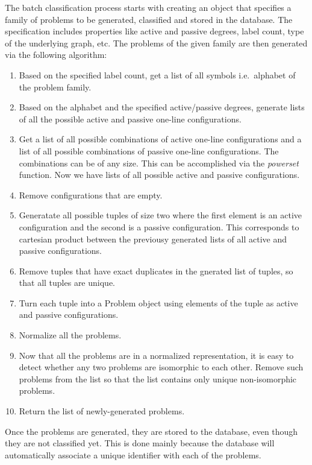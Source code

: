 The batch classification process starts with creating
an object that specifies a family of problems to be
generated, classified and stored in the database.
The specification includes properties like
active and passive degrees, label count, type of the
underlying graph, etc. The problems of the given
family are then generated via the following algorithm:

\begin{enumerate}
  \item Based on the specified label count, get a list of
  all symbols i.e.\ alphabet of the problem family.
  \item Based on the alphabet and the specified active/passive
  degrees, generate lists of all the possible
  active and passive one-line configurations.
  \item Get a list of all possible combinations
  of active one-line configurations and a list of all possible
  combinations of passive one-line configurations. The combinations
  can be of any size. This can be accomplished via
  the \emph{powerset} function. Now we have lists of
  all possible active and passive configurations.
  \item Remove configurations that are empty.
  \item Generatate all possible tuples of size two
  where the first element is an active configuration and
  the second is a passive configuration. This corresponds
  to cartesian product between the previousy generated
  lists of all active and passive configurations.
  \item Remove tuples that have exact duplicates in the
  gnerated list of tuples, so that all tuples are unique.
  \item Turn each tuple into a Problem object using
  elements of the tuple as active and passive configurations.
  \item Normalize all the problems.
  \item Now that all the problems are in a normalized 
  representation, it is easy to detect whether any two
  problems are isomorphic to each other. Remove such
  problems from the list so that the list contains only
  unique non-isomorphic problems.
  \item Return the list of newly-generated problems.
\end{enumerate}

Once the problems are generated, they are stored to the database,
even though they are not classified yet. This is done mainly
because the database will automatically associate a unique
identifier with each of the problems.

